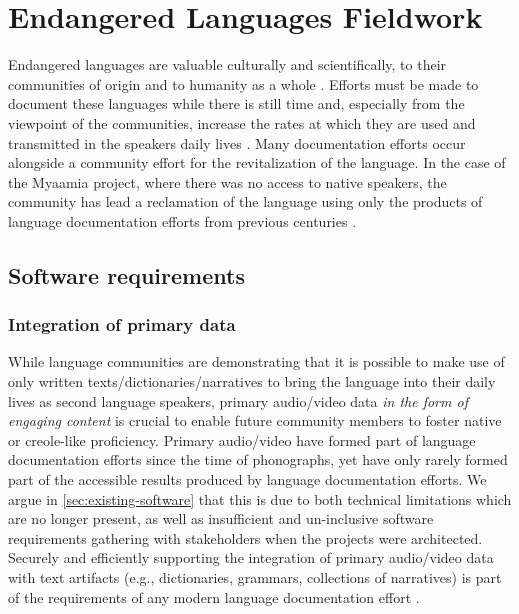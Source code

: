 \documentclass[11pt]{article}
\begin{document}
\section{Endangered Languages Fieldwork}\label{sec:fieldwork}

Endangered languages are valuable culturally and scientifically, to their
communities of origin \cite{Ironstrack:2012} and to humanity as a whole
\cite{harrison2007languages}. Efforts must be made to document these languages
while there is still time and, especially from the viewpoint of the
communities, increase the rates at which they are used and transmitted in the
speakers daily lives \cite{Myaamia:2001}.  Many documentation efforts occur
alongside a community effort for the revitalization of the language.  In the
case of the Myaamia project, where there was no access to native speakers, the
community has lead a reclamation \cite{Leonard:2012} of the language using only
the products of language documentation efforts from previous centuries
\cite{Costa:2012}.


\subsection{Software requirements}
\label{sec:requirements}


\subsubsection{Integration of primary data}
 While language communities are demonstrating that it is possible to make use of only written texts/dictionaries/narratives to bring the language into their daily lives as second language speakers, 
 primary audio/video data \emph{in the form of engaging content} is crucial to enable future community members to foster native or creole-like proficiency. 
 Primary audio/video  have formed part of  language documentation efforts since the time of phonographs, yet have only rarely formed part of the accessible results produced by language documentation efforts. 
 We argue in \autoref{sec:existing-software} that this is  due to both technical limitations which are no longer present, as well as insufficient and un-inclusive software requirements gathering with stakeholders when the projects were architected. 
Securely and efficiently supporting the integration of primary audio/video data with text artifacts
(e.g., dictionaries, grammars, collections of narratives) is part of the requirements of any modern language documentation effort \cite{Schroeter:2006} \cite{Good:2012b}. 
\end{document}
